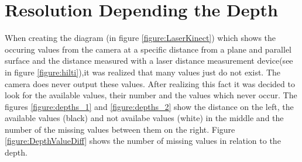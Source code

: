 \section{Resolution Depending the Depth} \label{resdepDepth}
When creating the diagram (in figure \vref{figure:LaserKinect}) which shows the occuring values from the camera 
at a specific distance from a plane and parallel surface and the distance measured with a laser distance measurement 
device(see in figure \vref{figure:hilti}),it was realized that many values just do not exist. The camera does never output these values.
After realizing this fact it was decided to look for the available values, their number and the values which never occur.
The figures \vref{figure:depths_1} and \vref{figure:depths_2} show the distance on the left, the available values (black) and 
not availabe values (white) in the middle and the number of the missing values between them on the right. 
Figure \vref{figure:DepthValueDiff} shows the number of missing values in relation to the depth.


